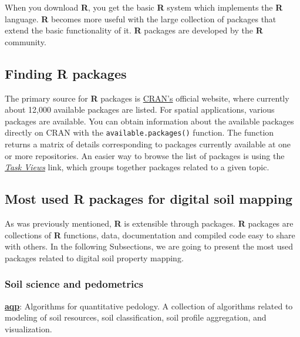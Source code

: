 \documentclass[10pt,b5paper,]{book}
\theoremstyle{definition}
\theoremstyle{definition}
\theoremstyle{definition}
\theoremstyle{remark}
\begin{document}
When you download \textbf{R}, you get the basic \textbf{R} system which
implements the \textbf{R} language. \textbf{R} becomes more useful with
the large collection of packages that extend the basic functionality of
it. \textbf{R} packages are developed by the \textbf{R} community.

\hypertarget{finding-r-packages}{%
\subsection{Finding R packages}\label{finding-r-packages}}

The primary source for \textbf{R} packages is
\href{https://cran.r-project.org/}{CRAN's} official website, where
currently about 12,000 available packages are listed. For spatial
applications, various packages are available. You can obtain information
about the available packages directly on CRAN with the
\texttt{available.packages()} function. The function returns a matrix of
details corresponding to packages currently available at one or more
repositories. An easier way to browse the list of packages is using the
\href{https://cran.r-project.org/web/views/}{\emph{Task Views}} link,
which groups together packages related to a given topic.

\hypertarget{most-used-r-packages-for-digital-soil-mapping}{%
\subsection{Most used R packages for digital soil
mapping}\label{most-used-r-packages-for-digital-soil-mapping}}

As was previously mentioned, \textbf{R} is extensible through packages.
\textbf{R} packages are collections of \textbf{R} functions, data,
documentation and compiled code easy to share with others. In the
following Subsections, we are going to present the most used packages
related to digital soil property mapping.

\hypertarget{SoilPedometrics}{%
\subsubsection{Soil science and pedometrics}\label{SoilPedometrics}}

\href{https://CRAN.R-project.org/package=aqp}{\textbf{aqp}}: Algorithms
for quantitative pedology. A collection of algorithms related to
modeling of soil resources, soil classification, soil profile
aggregation, and visualization.
\end{document}
